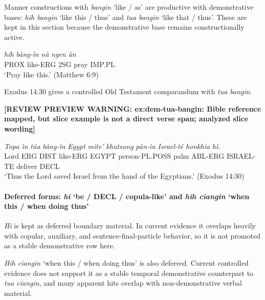 \documentclass[
  11pt,
  a4paper,
]{article}
\newcommand{\tdim}[1]{\textit{#1}}
\newcommand{\tdimword}[1]{\textit{#1}}
\renewcommand{\textsc}[1]{{\footnotesize\MakeUppercase{#1}}}
\newcommand{\glossquote}[1]{`#1'}
\newcommand{\reviewwarninginline}[1]{\textbf{#1}\par\smallskip}
\begin{document}
Manner constructions with \tdim{bangin} \glossquote{like / as} are
productive with demonstrative bases: \tdim{hih bangin}
\glossquote{like this / thus} and \tdim{tua bangin}
\glossquote{like that / thus}. These are kept in this section because
the demonstrative base remains constructionally active.

\begin{exe}
\ex \label{ex:dem-hih-bangin}
\gll \tdimword{híh} \tdimword{bàng-ìn} \tdimword{nà} \tdimword{ngen} \tdimword{ùn} \\
     \textsc{prox} like-\textsc{erg} \textsc{2sg} pray \textsc{imp}.\textsc{pl} \\
\glt \glossquote{Pray like this.} (Matthew 6:9)
\end{exe}

Exodus 14:30 gives a controlled Old Testament comparandum with
\tdim{tua bangin}.

\begin{exe}
\ex \label{ex:dem-tua-bangin}
\reviewwarninginline{[REVIEW PREVIEW WARNING: ex:dem-tua-bangin: Bible reference mapped, but slice example is not a direct verse span; analyzed slice wording]}
\gll \tdimword{Topa} \tdimword{ìn} \tdimword{túa} \tdimword{bàng-ìn} \tdimword{Egypt} \tdimword{mite'} \tdimword{khutsung} \tdimword{pàn-ìn} \tdimword{Israel-té} \tdimword{honkhia} \tdimword{hì.} \\
     Lord \textsc{erg} \textsc{dist} like-\textsc{erg} \textsc{egypt} person-\textsc{pl}.\textsc{poss} palm \textsc{abl}-\textsc{erg} \textsc{israel}-\textsc{te} deliver \textsc{decl} \\
\glt \glossquote{Thus the Lord saved Israel from the hand of the Egyptians.} (Exodus 14:30)
\end{exe}

\paragraph{\texorpdfstring{Deferred forms: \tdim{hi}
\glossquote{be / DECL / copula-like} and \tdim{hih ciangin}
\glossquote{when this / when doing thus}}{Deferred forms:   and  }}\label{deferred-forms-and}

\tdim{Hi} is kept as deferred boundary material. In current evidence it
overlaps heavily with copular, auxiliary, and sentence-final-particle
behavior, so it is not promoted as a stable demonstrative row here.

\tdim{Hih ciangin} \glossquote{when this / when doing thus} is also
deferred. Current controlled evidence does not support it as a stable
temporal demonstrative counterpart to \tdim{tua ciangin}, and many
apparent hits overlap with non-demonstrative verbal material.
\end{document}

